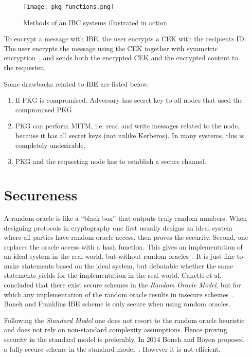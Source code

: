 \begin{figure}[ht]
  \centering
  \texttt{[image: pkg\_functions.png]}
  \caption{Methods of an IBC systems illustrated in action.}
  \label{fig:pkg_functions}
\end{figure}

To encrypt a message with \gls{IBE}, the user encrypts a \gls{CEK} with the recipients \gls{ID}.
The user encrypts the message using the \gls{CEK} together with symmetric encryption~\cite[section 2.2.2]{rfc5408}, and sends both the encrypted \gls{CEK} and the encrypted content to the requester. 

Some drawbacks related to \gls{IBE} are listed below:
\begin{enumerate}
	\item If \gls{PKG} is compromised. Adversary has secret key to all nodes that used the compromised \gls{PKG}
	\item \gls{PKG} can perform \gls{MITM}, i.e. read and write messages related to the node, because it has all secret keys (not unlike Kerberos).
  In many systems, this is completely undesirable.
	\item \gls{PKG} and the requesting node has to establish a secure channel. 
\end{enumerate}

\section{Secureness}

A random oracle is like a ``black box'' that outputs truly random numbers.
When designing protocols in cryptography one first usually designs an ideal system where all parties have random oracle access, then proves the security.
Second, one replaces the oracle access with a hash function.
This gives an implementation of an ideal system in the real world, but without random oracles~\cite{DBLP:conf/ccs/BellareR93}. 
It is just fine to make statements based on the ideal system, but debatable whether the same statements yields for the implementation in the real world.
Canetti et al. concluded that there exist secure schemes in the \textit{Random Oracle Model}, but for which any implementation of the random oracle results in insecure schemes~\cite{DBLP:journals/jacm/CanettiGH04}.
Boneh and Franklins \gls{IBE} scheme is only secure when using random oracles.

Following the \textit{Standard Model} one does not resort to the random oracle heuristic and does not rely on non-standard complexity assumptions.
Hence proving security in the standard model is preferably.
In 2014 Boneh and Boyen proposed a fully secure scheme in the standard model~\cite{DBLP:conf/crypto/BonehB04}.
However it is not efficient. 

